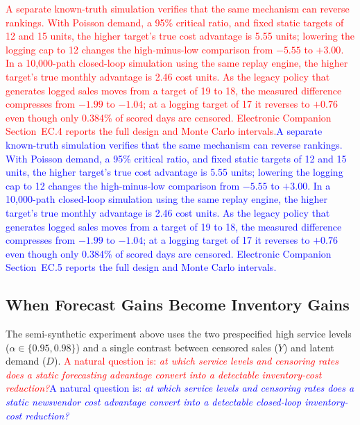 \documentclass[msom,dblanonrev]{informs4}
\newcommand{\add}[1]{\textcolor{blue}{#1}}
\newcommand{\reduce}[1]{\textcolor{red}{#1}\hspace{0.5em}}
\begin{document}
\reduce{A separate known-truth simulation verifies that the same mechanism can reverse rankings. With Poisson demand, a 95\% critical ratio, and fixed static targets of 12 and 15 units, the higher target's true cost advantage is 5.55 units; lowering the logging cap to 12 changes the high-minus-low comparison from $-5.55$ to $+3.00$. In a 10{,}000-path closed-loop simulation using the same replay engine, the higher target's true monthly advantage is 2.46 cost units. As the legacy policy that generates logged sales moves from a target of 19 to 18, the measured difference compresses from $-1.99$ to $-1.04$; at a logging target of 17 it reverses to $+0.76$ even though only 0.384\% of scored days are censored. Electronic Companion Section~EC.4 reports the full design and Monte Carlo intervals.}\add{A separate known-truth simulation verifies that the same mechanism can reverse rankings. With Poisson demand, a 95\% critical ratio, and fixed static targets of 12 and 15 units, the higher target's true cost advantage is 5.55 units; lowering the logging cap to 12 changes the high-minus-low comparison from $-5.55$ to $+3.00$. In a 10{,}000-path closed-loop simulation using the same replay engine, the higher target's true monthly advantage is 2.46 cost units. As the legacy policy that generates logged sales moves from a target of 19 to 18, the measured difference compresses from $-1.99$ to $-1.04$; at a logging target of 17 it reverses to $+0.76$ even though only 0.384\% of scored days are censored. Electronic Companion Section~EC.5 reports the full design and Monte Carlo intervals.}

\subsection{When Forecast Gains Become Inventory Gains}\label{sec:conversion}

The semi-synthetic experiment above uses the two prespecified high service levels ($\alpha\in\{0.95,0.98\}$) and a single contrast between censored sales ($Y$) and latent demand ($D$).
\reduce{A natural question is: \emph{at which service levels and censoring rates does a static forecasting advantage convert into a detectable inventory-cost reduction?}}\add{A natural question is: \emph{at which service levels and censoring rates does a static newsvendor cost advantage convert into a detectable closed-loop inventory-cost reduction?}}
\end{document}
